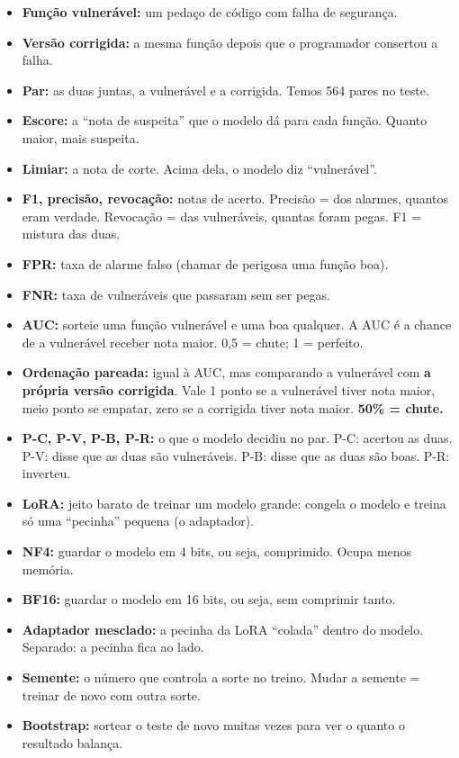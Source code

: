 \documentclass[11pt,a4paper]{article}
\begin{document}
\begin{itemize}
  \item \textbf{Função vulnerável:} um pedaço de código com falha de segurança.
  \item \textbf{Versão corrigida:} a mesma função depois que o programador consertou a falha.
  \item \textbf{Par:} as duas juntas, a vulnerável e a corrigida. Temos 564 pares no teste.
  \item \textbf{Escore:} a ``nota de suspeita'' que o modelo dá para cada função. Quanto maior, mais suspeita.
  \item \textbf{Limiar:} a nota de corte. Acima dela, o modelo diz ``vulnerável''.
  \item \textbf{F1, precisão, revocação:} notas de acerto. Precisão = dos alarmes, quantos eram verdade. Revocação = das vulneráveis, quantas foram pegas. F1 = mistura das duas.
  \item \textbf{FPR:} taxa de alarme falso (chamar de perigosa uma função boa).
  \item \textbf{FNR:} taxa de vulneráveis que passaram sem ser pegas.
  \item \textbf{AUC:} sorteie uma função vulnerável e uma boa qualquer. A AUC é a chance de a vulnerável receber nota maior. 0,5 = chute; 1 = perfeito.
  \item \textbf{Ordenação pareada:} igual à AUC, mas comparando a vulnerável com \textbf{a própria versão corrigida}. Vale 1 ponto se a vulnerável tiver nota maior, meio ponto se empatar, zero se a corrigida tiver nota maior. \textbf{50\% = chute.}
  \item \textbf{P-C, P-V, P-B, P-R:} o que o modelo decidiu no par. P-C: acertou as duas. P-V: disse que as duas são vulneráveis. P-B: disse que as duas são boas. P-R: inverteu.
  \item \textbf{LoRA:} jeito barato de treinar um modelo grande: congela o modelo e treina só uma ``pecinha'' pequena (o adaptador).
  \item \textbf{NF4:} guardar o modelo em 4 bits, ou seja, comprimido. Ocupa menos memória.
  \item \textbf{BF16:} guardar o modelo em 16 bits, ou seja, sem comprimir tanto.
  \item \textbf{Adaptador mesclado:} a pecinha da LoRA ``colada'' dentro do modelo. Separado: a pecinha fica ao lado.
  \item \textbf{Semente:} o número que controla a sorte no treino. Mudar a semente = treinar de novo com outra sorte.
  \item \textbf{Bootstrap:} sortear o teste de novo muitas vezes para ver o quanto o resultado balança.
\end{itemize}
\end{document}
